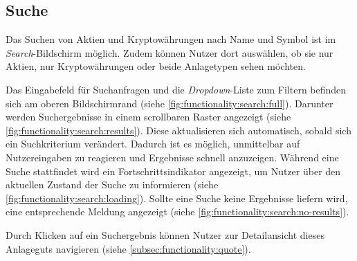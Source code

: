 \documentclass[a4paper]{article}
\begin{document}
\subsection{Suche}
\label{subsec:functionality:search}
Das Suchen von Aktien und Kryptowährungen nach Name und Symbol ist im \textit{Search}-Bildschirm möglich.
Zudem können Nutzer dort auswählen, ob sie nur Aktien, nur Kryptowährungen oder beide Anlagetypen sehen möchten.

Das Eingabefeld für Suchanfragen und die \textit{Dropdown}-Liste zum Filtern befinden sich am oberen Bildschirmrand (siehe \autoref{fig:functionality:search:full}).
Darunter werden Suchergebnisse in einem scrollbaren Raster angezeigt (siehe \autoref{fig:functionality:search:results}).
Diese aktualisieren sich automatisch, sobald sich ein Suchkriterium verändert.
Dadurch ist es möglich, unmittelbar auf Nutzereingaben zu reagieren und Ergebnisse schnell anzuzeigen.
Während eine Suche stattfindet wird ein Fortschritts\-indikator angezeigt, um Nutzer über den aktuellen Zustand der Suche zu informieren (siehe \autoref{fig:functionality:search:loading}).
Sollte eine Suche keine Ergebnisse liefern wird, eine entsprechende Meldung angezeigt (siehe \autoref{fig:functionality:search:no-results}).

Durch Klicken auf ein Suchergebnis können Nutzer zur Detailansicht dieses Anlageguts navigieren (siehe \autoref{subsec:functionality:quote}).
\end{document}
